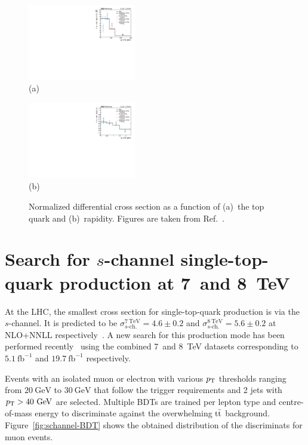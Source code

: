 \documentclass{PoS}
\begin{document}
\begin{figure}[htbp]
\begin{center}
\parbox[t]{0.49\textwidth}{\centering\includegraphics[width=0.42\textwidth]{figures/tchannel_diff/top_pt_unfolded.pdf}\\(a)}
\parbox[t]{0.49\textwidth}{\centering\includegraphics[width=0.42\textwidth]{figures/tchannel_diff/top_y_unfolded.pdf}\\(b)}
\caption{\label{fig:TOP-16-004-unfolded}Normalized differential cross section as a function of (a)~the top quark \pt and (b)~rapidity. Figures are taken from Ref.~\cite{CMS-PAS-TOP-16-004}.}
\end{center}
\end{figure}



\section{Search for $s$-channel single-top-quark production at 7~and 8~TeV}
At the LHC, the smallest cross section for single-top-quark production is via the $s$-channel. It is predicted to be $\sigma_{s\mbox{-}\mathrm{ch.}}^\mathrm{7~TeV}=4.6\pm0.2$ and $\sigma_{s\mbox{-}\mathrm{ch.}}^\mathrm{8~TeV}=5.6\pm0.2$ at NLO+NNLL respectively~\cite{schannel-xsec}. A new search for this production mode has been performed recently~\cite{CMS-PAS-TOP-13-009} using the combined 7~and 8~TeV datasets corresponding to $5.1~\mathrm{fb}^{-1}$ and $19.7~\mathrm{fb}^{-1}$ respectively.

Events with an isolated muon or electron with various $p_\mathrm{T}$ thresholds ranging from $20~\mathrm{GeV}$ to $30~\mathrm{GeV}$ that follow the trigger requirements and 2 jets with $p_\mathrm{T}>40~\mathrm{GeV}$ are selected. Multiple BDTs are trained per lepton type and centre-of-mass energy to discriminate against the overwhelming $\mathrm{t}\bar{\mathrm{t}}$ background. Figure~\ref{fig:schannel-BDT} shows the obtained distribution of the discriminats for muon events.
\end{document}
